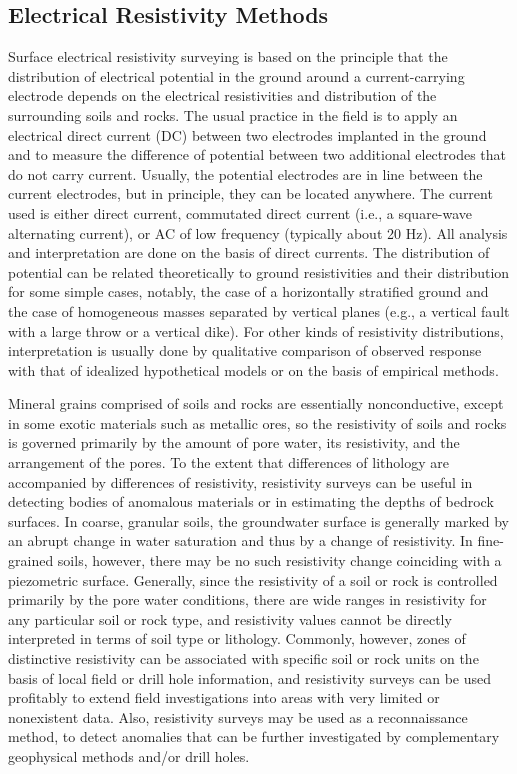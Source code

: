 \documentclass[12pt,a4paper]{report}
\begin{document}
\subsection{Electrical Resistivity Methods}
Surface electrical resistivity surveying is based on the principle that the distribution of electrical potential in the ground around a current-carrying electrode depends on the electrical resistivities and distribution of the surrounding soils and rocks.  The usual practice in the field is to apply an electrical direct current (DC) between two electrodes implanted in the ground and to measure the difference of potential between two additional electrodes that do not carry current.  Usually, the potential electrodes are in line between the current electrodes, but in principle, they can be located anywhere.  The current used is either direct current, commutated direct current (i.e., a square-wave alternating current), or AC of low frequency (typically about 20 Hz).  All analysis and interpretation are done on the basis of direct currents.  The distribution of potential can be related theoretically to ground resistivities and their distribution for some simple cases, notably, the case of a horizontally stratified ground and the case of homogeneous masses separated by vertical planes (e.g., a vertical fault with a large throw or a vertical dike).  For other kinds of resistivity distributions, interpretation is usually done by qualitative comparison of observed response with that of idealized hypothetical models or on the basis of empirical methods.

Mineral grains comprised of soils and rocks are essentially nonconductive, except in some exotic materials such as metallic ores, so the resistivity of soils and rocks is governed primarily by the amount of pore water, its resistivity, and the arrangement of the pores.  To the extent that differences of lithology are accompanied by differences of resistivity, resistivity surveys can be useful in detecting bodies of anomalous materials or in estimating the depths of bedrock surfaces.  In coarse, granular soils, the groundwater surface is generally marked by an abrupt change in water saturation and thus by a change of resistivity.  In fine-grained soils, however, there may be no such resistivity change coinciding with a piezometric surface.  Generally, since the resistivity of a soil or rock is controlled primarily by the pore water conditions, there are wide ranges in resistivity for any particular soil or rock type, and resistivity values cannot be directly interpreted in terms of soil type or lithology.  Commonly, however, zones of distinctive resistivity can be associated with specific soil or rock units on the basis of local field or drill hole information, and resistivity surveys can be used profitably to extend field investigations into areas with very limited or nonexistent data.  Also, resistivity surveys may be used as a reconnaissance method, to detect anomalies that can be further investigated by complementary geophysical methods and/or drill holes.
\end{document}
